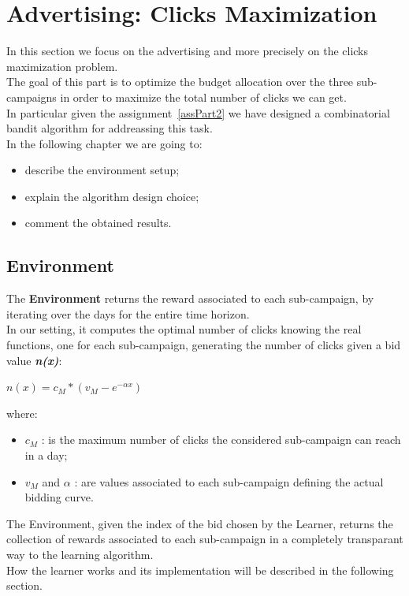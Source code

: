 \chapter{Advertising: Clicks Maximization}

In this section we focus on the advertising and more precisely on the clicks maximization problem.\\
The goal of this part is to optimize the budget allocation over the three sub-campaigns in order to maximize the total number of clicks we can get.\\
In particular given the assignment~\ref{assPart2} we have designed a combinatorial bandit algorithm for addreassing this task.\\
In the following chapter we are going to:
\begin{itemize}
	\item describe the environment setup;
	\item explain the algorithm design choice;
	\item comment the obtained results.
\end{itemize}

\section{Environment}
The \textbf{Environment} returns the reward associated to each sub-campaign, by iterating over the days for the entire time horizon.\\
In our setting, it computes the optimal number of clicks knowing the real functions, one for each sub-campaign, generating  the number of clicks given a bid value \textbf{\textit{n(x)}}:\\

\begin{center}
	$n(x) = c_{M} * (v_{M} - e^{-\alpha x})$
\end{center}

where:
\begin{itemize}
	\item $c_{M}$ : is the maximum number of clicks the considered sub-campaign can reach in a day;
	\item $v_{M}$ and $\alpha$ : are values associated to each sub-campaign defining the actual bidding curve.
\end{itemize}


The Environment, given the index of the bid chosen by the Learner, returns the collection of rewards associated to each sub-campaign in a completely transparant way to the learning algorithm.\\
How the learner works and its implementation will be described in the following section.



